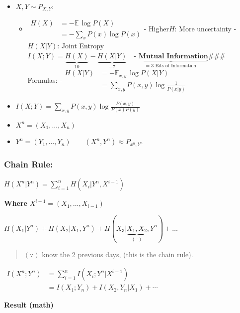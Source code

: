 \documentclass[11pt]{article}
\providecommand{\tightlist}{%
      \setlength{\itemsep}{0pt}\setlength{\parskip}{0pt}}
\begin{document}
\begin{itemize}
\item
  \(X, Y \sim P_{X, Y}\):

  \begin{itemize}
  \tightlist
  \item
    \(\begin{align}
      H(X) &= -\mathbb{E} \, \log P(X) \\
           &= -\sum_x P(x) \log P(x)
           \end{align}\)- Higher\(H\): More uncertainty -\(H(X | Y)\):
    Joint
    Entropy\(I(X; Y) = \underbrace{H(X)}_{10} - \underbrace{H(X | Y)}_{ - 7} \quad \underbrace{\textbf{- Mutual Information}}_\text{= 3 Bits of Information}\)\#\#\#
    Formulas:
    -\(\begin{align} H(X | Y) &= -\mathbb{E}_{x,y} \, \log P(X | Y) \\ &= \sum_{x, y} P(x, y) \log \frac{1}{P(x | y)} \end{align}\)
  \end{itemize}
\item
  \(I(X; Y) = \sum\limits_{x, y} P(x, y) \log \frac{P(x, y)}{P(x) P(y)}\)
\item
  \(X^n = (X_1, \dots, X_n)\)
\item
  \(Y^n = (Y_1, \dots, Y_n)\)\(\qquad (X^n,Y^n) \approx P_{x^n,Y^n}\)
\end{itemize}

\subsubsection{Chain Rule:}\label{chain-rule}

\(H(X^n | Y^n) = \sum\limits_{i=1}^n H(X_i | Y^n, X^{i-1})\)

\textbf{Where} \(X^{i-1} = (X_1, \dots, X_{i-1})\)

    \(H(X_1 | Y^n) + H(X_2 | X_1, Y^n) + H(X_3 | \underbrace{X_1, X_2}_{(\because)}, Y^n) + \dots\)

\begin{quote}
\((\because)\) know the 2 previous days, (this is the chain rule).
\end{quote}

\(\begin{align} I(X^n; Y^n) &= \sum\limits_{i=1}^n I(X_i; Y^n | X^{i-1}) \\ &= I(X_1; Y_n) + I(X_2, Y_n| X_1) + \cdots \end{align}\)

    \textbf{Result (math)}
\end{document}
